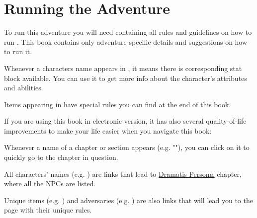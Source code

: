 \section{Running the Adventure}
\label{sec:runningAdventure}

To run this adventure you will need \handbook{} containing all rules and guidelines on how to run \cosmereRPG{}. This book contains only adventure-specific details and suggestions on how to run it.


Whenever a characters name appears in , it means there is corresponding stat block available. You can use it to get more info about the character's attributes and abilities.

Items appearing in  have special rules you can find at the end of this book.




If you are using this book in electronic version, it has also several quality-of-life improvements to make your life easier when you navigate this book:

Whenever a name of a chapter or section appears (e.g. ""), you can click on it to quickly go to the chapter in question.

All characters' names (e.g. \npcOdium{}) are links that lead to \hyperref[personae]{Dramatis Person\ae} chapter, where all the NPCs are listed.

Unique items (e.g. \lootExample{}) and adversaries (e.g. \enemyAxehound{}) are also links that will lead you to the page with their unique rules. 



